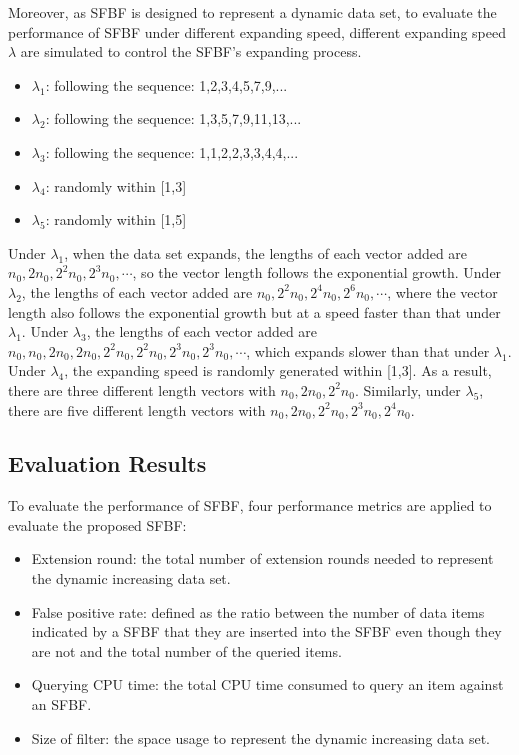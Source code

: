 \documentclass[10pt,journal,letterpaper]{IEEEtran}
\newcommand{\note}[1]{{\sffamily\itshape\bfseries\uline{#1}}}
\begin{document}
Moreover, as SFBF is designed to represent a dynamic data set, to evaluate the performance of SFBF under different expanding speed, different expanding speed $\lambda $ are simulated to control the SFBF's expanding process. %
\begin{itemize}
  \item $\lambda_1$: following the sequence: 1,2,3,4,5,7,9,...
  \item $\lambda_2$: following the sequence: 1,3,5,7,9,11,13,...
  \item $\lambda_3$: following the sequence: 1,1,2,2,3,3,4,4,...
  \item $\lambda_4$: randomly  within [1,3]
  \item $\lambda_5$: randomly  within [1,5]
\end{itemize}

Under  $\lambda_1$, when the data set expands, the lengths of each vector added are  ${n_0},2{n_0},{2^2}{n_0},{2^3}{n_0}, \cdots$, so the vector length follows the exponential growth. Under  $\lambda_2$, the lengths of each vector added are  ${n_0},{2^2}{n_0},{2^4}{n_0}, {2^6}{n_0},\cdots$, where the vector length also follows the exponential growth but at a speed faster than that under $\lambda_1$. Under  $\lambda_3$, the lengths of each vector added are  ${n_0},{n_0}, 2{n_0},2{n_0},{2^2}{n_0},{2^2}{n_0},{2^3}{n_0}, {2^3}{n_0},\cdots$, which expands slower than that under  $\lambda_1$.  Under $\lambda_4$, the expanding speed is randomly generated within [1,3]. As a result, there are three different length vectors with  ${n_0},2{n_0},{2^2}{n_0}$. Similarly, under $\lambda_5$, there are five different length vectors with  ${n_0},2{n_0},{2^2}{n_0},{2^3}{n_0},{2^4}{n_0}$.
\subsection{Evaluation Results}

To evaluate the performance of SFBF, four performance metrics are applied to evaluate the proposed SFBF:
\begin{itemize}
  \item  Extension round: the total number of extension rounds needed to represent the dynamic increasing data set.
  \item  False positive rate: defined as the ratio between the number
of data items indicated by a SFBF that they are inserted into the SFBF
even though they are not and the total number of the queried items.
  \item  Querying CPU time: the total CPU time consumed to query an item against an SFBF.
  \item Size of filter: the space usage to represent the dynamic increasing data set.
\end{itemize}
\end{document}
